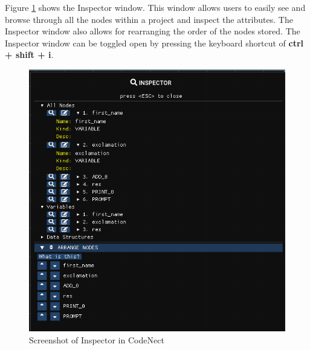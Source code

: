 \parx
Figure \ref{fig:cn_inspector} shows the Inspector window. This window allows
users to easily see and browse through all the nodes within a project and
inspect the attributes. The Inspector window also allows for rearranging the
order of the nodes stored. The Inspector window can be toggled open by pressing the
keyboard shortcut of \textbf{ctrl + shift + i}.

\begin{figure}[H]
	\centering
	\captionsetup{justification=centering}
	\captionsetup[figure]{list=yes}
	\includegraphics[width=\linewidth]{media/sc_inspector.png}
	\caption[Screenshot of Inspector in CodeNect]{Screenshot of Inspector in CodeNect}
	\label{fig:cn_inspector}
\end{figure}
